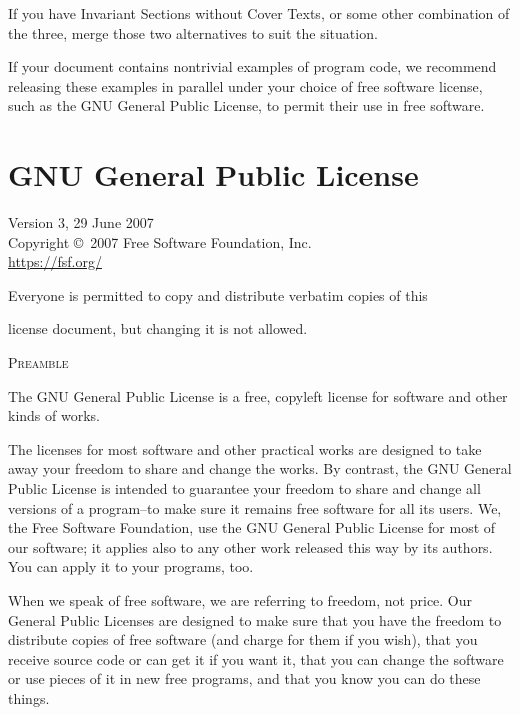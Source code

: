\documentclass{scrbook}
\begin{document}
If you have Invariant Sections without Cover Texts, or some other
combination of the three, merge those two alternatives to suit the
situation.

If your document contains nontrivial examples of program code, we
recommend releasing these examples in parallel under your choice of
free software license, such as the GNU General Public License,
to permit their use in free software.

\chapter{GNU General Public License}\label{chp:gnugpl}

\begin{center}
{\parindent 0in
Version 3, 29 June 2007\\
Copyright \copyright\  2007 Free Software Foundation, Inc.\\
\url{https://fsf.org/}

\bigskip
Everyone is permitted to copy and distribute verbatim copies of this

license document, but changing it is not allowed.}

\end{center}

\begin{center}
{\Large\textsc{Preamble}}
\end{center}

The GNU General Public License is a free, copyleft license for
software and other kinds of works.

The licenses for most software and other practical works are designed
to take away your freedom to share and change the works.  By contrast,
the GNU General Public License is intended to guarantee your freedom to
share and change all versions of a program--to make sure it remains free
software for all its users.  We, the Free Software Foundation, use the
GNU General Public License for most of our software; it applies also to
any other work released this way by its authors.  You can apply it to
your programs, too.

When we speak of free software, we are referring to freedom, not
price.  Our General Public Licenses are designed to make sure that you
have the freedom to distribute copies of free software (and charge for
them if you wish), that you receive source code or can get it if you
want it, that you can change the software or use pieces of it in new
free programs, and that you know you can do these things.
\end{document}
